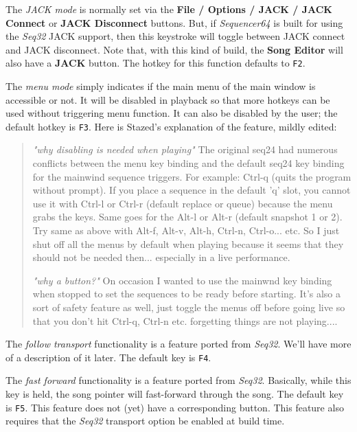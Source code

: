    The \textsl{JACK mode} is normally set via the
   \textbf{File / Options / JACK / JACK Connect} or 
   \textbf{JACK Disconnect} buttons.
   But, if \textsl{Sequencer64} is built for using the \textsl{Seq32} JACK
   support, then this keystroke will toggle between JACK connect and JACK
   disconnect.
   Note that, with this kind of build, the \textbf{Song Editor} will also have
   a \textbf{JACK} button.
   The hotkey for this function defaults to \texttt{F2}.

   The \textsl{menu mode} simply indicates if the main menu of the
   main window is accessible or not.  It will be disabled in playback
   so that more hotkeys can be used without triggering menu function.
   It can also be disabled by the user; the default hotkey is \texttt{F3}.
   Here is Stazed's explanation of the feature, mildly edited:

   \begin{quotation}
      \textsl{"why disabling is needed when playing"}
      The original seq24 had numerous conflicts between the menu key binding
      and the default seq24 key binding for the mainwind sequence triggers.
      For example: Ctrl-q (quits the program without prompt). If you place a
      sequence in the default 'q' slot, you cannot use it with Ctrl-l or Ctrl-r
      (default replace or queue) because the menu grabs the keys. Same goes for
      the Alt-l or Alt-r (default snapshot 1 or 2). Try same as above with
      Alt-f, Alt-v, Alt-h, Ctrl-n, Ctrl-o...  etc. So I just shut off all the
      menus by default when playing because it seems that they should not be
      needed then... especially in a live performance.

      \textsl{"why a button?"}
      On occasion I wanted to use the mainwnd key binding when stopped to set
      the sequences to be ready before starting. It's also a sort of safety
      feature as well, just toggle the menus off before going live so that you
      don't hit Ctrl-q, Ctrl-n etc. forgetting things are not playing....
   \end{quotation}

   The \textsl{follow transport} functionality is a feature ported
   from \textsl{Seq32}.  We'll have more of a description of it later.
   The default key is \texttt{F4}.

   The \textsl{fast forward} functionality is a feature ported
   from \textsl{Seq32}.
   Basically, while this key is held, the song pointer will fast-forward
   through the song.
   The default key is \texttt{F5}.
   This feature does not (yet) have a corresponding button.
   This feature also requires that the \textsl{Seq32} transport option be
   enabled at build time.


